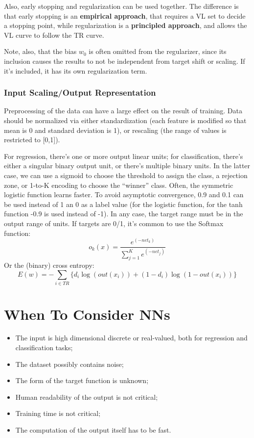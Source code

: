 Also, early stopping and regularization can be used together. The difference is that early stopping is an \textbf{empirical approach}, that requires a VL set to decide a stopping point, while regularization is a \textbf{principled approach}, and allows the VL curve to follow the TR curve.

Note, also, that the bias $w_0$ is often omitted from the regularizer, since its inclusion causes the results to not be independent from target shift or scaling. If it's included, it has its own regularization term.

\subsubsection{Input Scaling/Output Representation}

Preprocessing of the data can have a large effect on the result of training. Data should be normalized via either standardization (each feature is modified so that mean is 0 and standard deviation is 1), or rescaling (the range of values is restricted to [0,1]).

For regression, there's one or more output linear units; for classification, there's either a singular binary output unit, or there's multiple binary units. In the latter case, we can use a sigmoid to choose the threshold to assign the class, a rejection zone, or 1-to-K encoding to choose the ``winner'' class. Often, the symmetric logistic function learns faster. To avoid asymptotic convergence, 0.9 and 0.1 can be used instead of 1 an 0 as a label value (for the logistic function, for the tanh function -0.9 is used instead of -1). In any case, the target range must be in the output range of units. If targets are 0/1, it's common to use the Softmax function:
\begin{equation*}
    o_k(x) = \dfrac{e^{(-net_k)}}{\sum_{j=1}^Ke^{(-net_j)}}
\end{equation*}
Or the (binary) cross entropy:
\begin{equation*}
   E(w) = - \sum_{i \in TR} \{ d_i \log (out(x_i)) + (1-d_i) \log(1-out(x_i)) \}
\end{equation*}

\section{When To Consider NNs}

\begin{itemize}
    \item The input is high dimensional discrete or real-valued, both for regression and classification tasks;
    \item The dataset possibly contains noise;
    \item The form of the target function is unknown;
    \item Human readability of the output is not critical;
    \item Training time is not critical;
    \item The computation of the output itself has to be fast.
\end{itemize}